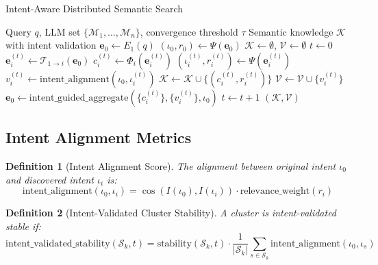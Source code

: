 \documentclass{article}
\newtheorem{definition}{Definition}
\begin{document}
\begin{algorithm}
\caption{Intent-Aware Distributed Semantic Search}
\begin{algorithmic}[1]
\REQUIRE Query $q$, LLM set $\{\mathcal{M}_1, \ldots, \mathcal{M}_n\}$, convergence threshold $\tau$
\ENSURE Semantic knowledge $\mathcal{K}$ with intent validation
\STATE $\mathbf{e}_0 \leftarrow E_1(q)$
\STATE $(\iota_0, r_0) \leftarrow \Psi(\mathbf{e}_0)$ 
\STATE $\mathcal{K} \leftarrow \emptyset$, $\mathcal{V} \leftarrow \emptyset$ 
\STATE $t \leftarrow 0$
\REPEAT
        \STATE $\mathbf{e}_i^{(t)} \leftarrow \mathcal{T}_{1 \rightarrow i}(\mathbf{e}_0)$
        \STATE $c_i^{(t)} \leftarrow \Phi_i(\mathbf{e}_i^{(t)})$ 
        \STATE $(\iota_i^{(t)}, r_i^{(t)}) \leftarrow \Psi(\mathbf{e}_i^{(t)})$ 
        \STATE $v_i^{(t)} \leftarrow \text{intent\_alignment}(\iota_0, \iota_i^{(t)})$ 
        \STATE $\mathcal{K} \leftarrow \mathcal{K} \cup \{(c_i^{(t)}, r_i^{(t)})\}$
        \STATE $\mathcal{V} \leftarrow \mathcal{V} \cup \{v_i^{(t)}\}$
    \ENDFOR
    \STATE $\mathbf{e}_0 \leftarrow \text{intent\_guided\_aggregate}(\{c_i^{(t)}\}, \{v_i^{(t)}\}, \iota_0)$
    \STATE $t \leftarrow t + 1$
\RETURN $(\mathcal{K}, \mathcal{V})$
\end{algorithmic}
\end{algorithm}

\subsection{Intent Alignment Metrics}

\begin{definition}[Intent Alignment Score]
The alignment between original intent $\iota_0$ and discovered intent $\iota_i$ is:
$$\text{intent\_alignment}(\iota_0, \iota_i) = \cos(I(\iota_0), I(\iota_i)) \cdot \text{relevance\_weight}(r_i)$$
\end{definition}

\begin{definition}[Intent-Validated Cluster Stability]
A cluster is intent-validated stable if:
$$\text{intent\_validated\_stability}(\mathcal{S}_k, t) = \text{stability}(\mathcal{S}_k, t) \cdot \frac{1}{|\mathcal{S}_k|}\sum_{s \in \mathcal{S}_k} \text{intent\_alignment}(\iota_0, \iota_s)$$
\end{definition}
\end{document}
